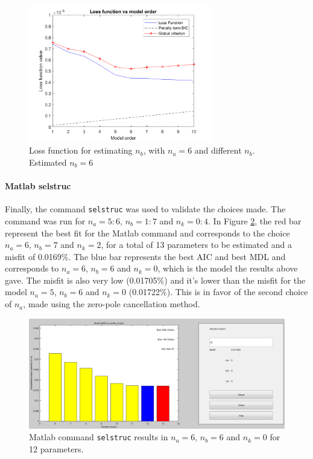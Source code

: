 \documentclass[a4paper,11pt]{article}
\begin{document}
\begin{figure}[H]
\centering
\includegraphics[width = 8cm]{images/2_loss_funct_order}
\caption{Loss function for estimating $n_b$, with $n_a = 6$ and different $n_b$. Estimated $n_b = 6$}
\label{fig:loss_funct_2}
\end{figure}


\paragraph{Matlab selstruc}
Finally, the command \texttt{selstruc} was used to validate the choices made. The command was run for $n_a = 5:6$, $n_b = 1:7$ and $n_k = 0:4$. In Figure \ref{fig:selstruc}, the red bar represent the best fit for the Matlab command and corresponds to the choice $n_a = 6$, $n_b = 7$ and $n_k = 2$, for a total of 13 parameters to be estimated and a misfit of 0.0169\%. The blue bar represents the best AIC and best MDL and corresponds to $n_a = 6$, $n_b = 6$ and $n_k = 0$, which is the model the results above gave. The misfit is also very low (0.01705\%) and it's lower than the misfit for the model $n_a = 5$, $n_b = 6$ and $n_k = 0$ (0.01722\%). This is in favor of the second choice of $n_a$, made using the zero-pole cancellation method.


\begin{figure}[H]
\centering
\includegraphics[width = 14cm]{images/selstruc}
\caption{Matlab command \texttt{selstruc} results in $n_a = 6$, $n_b = 6$ and $n_k = 0$ for 12 parameters.}
\label{fig:selstruc}
\end{figure}
 
\end{document}
